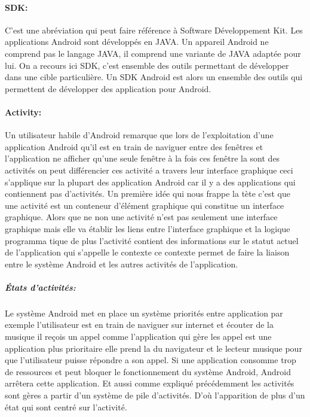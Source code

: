 \paragraph{SDK:}

C'est une abréviation qui peut faire référence à Software Développement Kit.
Les applications Android sont développés en JAVA\@. Un appareil Android ne
comprend pas le langage JAVA, il comprend une variante de JAVA adaptée pour lui.
On a recours ici SDK, c'est ensemble des outils permettant de développer dans
une cible particulière. Un SDK Android est alors un ensemble des outils qui
permettent de développer des application pour Android.

\paragraph{Activity:}

Un utilisateur habile d'Android remarque que lors de l'exploitation d'une
application Android qu'il est en train de naviguer entre des fenêtres et
l'application ne afficher qu'une seule fenêtre à la fois ces fenêtre la sont
des activités on peut différencier ces activité a travers leur interface
graphique ceci s'applique sur la plupart des application Android car il y a
des applications qui contiennent pas d'activités. Un première idée qui nous
frappe la tète c'est que une activité est un conteneur d'élément graphique qui
constitue un interface graphique. Alors que ne non une activité n'est pas
seulement une interface graphique mais elle va établir les liens entre
l'interface graphique et la logique programma tique de plus l'activité
contient des informations sur le statut actuel de l'application qui s'appelle le
contexte ce contexte permet de faire la liaison entre le système Android et les
autres activités de l'application.

\subparagraph{États d'activités:}

Le système Android met en place un système priorités entre application
par exemple l'utilisateur est en train de naviguer sur internet et écouter
de la musique il reçois un appel comme l'application qui gère les appel est
une application plus prioritaire elle prend la du navigateur et le lecteur
musique pour que l'utilisateur puisse répondre a son appel. Si une application
consomme trop de ressources et peut bloquer le fonctionnement du système Android,
Android arrêtera cette application. Et aussi comme expliqué précédemment
les activités sont gères a partir d'un système de pile d'activités.
D'où l'apparition de plus d'un état qui sont centré sur l'activité.

